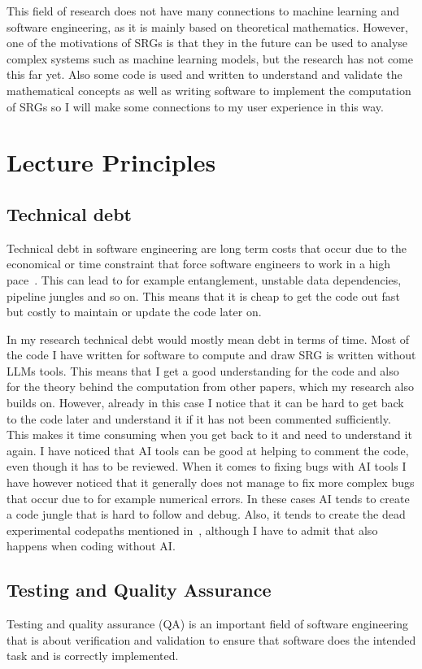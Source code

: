\documentclass[a4paper, 11pt]{article}
\begin{document}
This field of research does not have many connections to machine learning and software engineering, as it is mainly based on theoretical mathematics. However, one of the motivations of SRGs is that they in the future can be used to analyse complex systems such as machine learning models, but the research has not come this far yet. Also some code is used and written to understand and validate the mathematical concepts as well as writing software to implement the computation of SRGs so I will make some connections to my user experience in this way. 


\section{Lecture Principles}

\subsection{Technical debt}
Technical debt in software engineering are long term costs that occur due to the economical or time constraint that force software engineers to work in a high pace~\cite{NIPS2015_86df7dcf}. This can lead to for example entanglement, unstable data dependencies, pipeline jungles and so on. This means that it is cheap to get the code out fast but costly to maintain or update the code later on. 

In my research technical debt would mostly mean debt in terms of time. Most of the code I have written for software to compute and draw SRG is written without LLMs tools. This means that I get a good understanding for the code and also for the theory behind the computation from other papers, which my research also builds on. However, already in this case I notice that it can be hard to get back to the code later and understand it if it has not been commented sufficiently. This makes it time consuming when you get back to it and need to understand it again. I have noticed that AI tools can be good at helping to comment the code, even though it has to be reviewed. When it comes to fixing bugs with AI tools I have however noticed that it generally does not manage to fix more complex bugs that occur due to for example numerical errors. In these cases AI tends to create a code jungle that is hard to follow and debug. Also, it tends to create the dead experimental codepaths mentioned in~\cite{NIPS2015_86df7dcf}, although I have to admit that also happens when coding without AI.  

\subsection{Testing and Quality Assurance}
Testing and quality assurance (QA) is an important field of software engineering that is about verification and validation to ensure that software does the intended task and is correctly implemented. 
\end{document}
